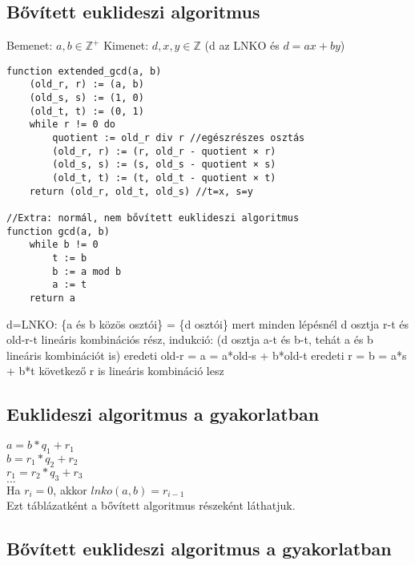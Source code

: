 \documentclass[12pt,a4paper]{article}
\begin{document}
\pagebreak

\subsection{Bővített euklideszi algoritmus}

\begin{outline}
	\1 Bemenet: $a,b \in \mathbb{Z}^+$
	\1 Kimenet: $d,x,y \in \mathbb{Z}$ (d az LNKO és $d=ax+by$)
	
\end{outline}

\begin{verbatim}
function extended_gcd(a, b)
    (old_r, r) := (a, b)
    (old_s, s) := (1, 0)
    (old_t, t) := (0, 1)
    while r != 0 do
        quotient := old_r div r //egészrészes osztás
        (old_r, r) := (r, old_r - quotient × r)
        (old_s, s) := (s, old_s - quotient × s)
        (old_t, t) := (t, old_t - quotient × t)
    return (old_r, old_t, old_s) //t=x, s=y

//Extra: normál, nem bővített euklideszi algoritmus
function gcd(a, b)
    while b != 0
        t := b
        b := a mod b
        a := t
    return a
\end{verbatim}

\begin{outline}
	\1 d=LNKO: \{a és b közös osztói\} = \{d osztói\}
		\2 mert minden lépésnél d osztja r-t és old-r-t
	\1 lineáris kombinációs rész, indukció:
		\2 (d osztja a-t és b-t, tehát a és b lineáris kombinációt is)
		\2 eredeti old-r = a = a*old-s + b*old-t
		\2 eredeti r = b = a*s + b*t
		\2 következő r is lineáris kombináció lesz
\end{outline}

\pagebreak

\subsection{Euklideszi algoritmus a gyakorlatban}

$a = b * q_1 + r_1$ \\
$b = r_1 * q_2 + r_2$ \\
$r_1 = r_2 * q_3 + r_3$ \\
$...$ \\
Ha $r_i=0$, akkor $lnko(a,b)=r_{i-1}$ \\
Ezt táblázatként a bővített algoritmus részeként láthatjuk.

\subsection{Bővített euklideszi algoritmus a gyakorlatban}
\end{document}
